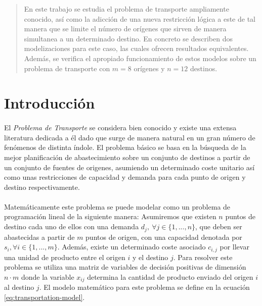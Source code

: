 \documentclass[a4paper, spanish]{article}
\begin{document}
  \maketitle

  \begin{abstract}
    \noindent En este trabajo se estudia el problema de transporte ampliamente conocido, así como la adicción de una nueva restricción lógica a este de tal manera que se limite el número de orígenes que sirven de manera simultanea a un determinado destino. En concreto se describen dos modelizaciones para este caso, las cuales ofrecen resultados equivalentes. Además, se verifica el apropiado funcionamiento de estos modelos sobre un problema de transporte con $m = 8$ orígenes y $n = 12$ destinos.
  \end{abstract}


  \section{Introducción}
  \label{sec:introduction}

    \paragraph{}
    El \emph{Problema de Transporte} se considera bien conocido y existe una extensa literatura dedicada a él dado que surge de manera natural en un gran número de fenómenos de distinta índole. El problema básico se basa en la búsqueda de la mejor planificación de abastecimiento sobre un conjunto de destinos a partir de un conjunto de fuentes de origenes, asumiendo un determinado coste unitario así como unas restricciones de capacidad y demanda para cada punto de origen y destino respectivamente.

    \paragraph{}
    Matemáticamente este problema se puede modelar como un problema de programación lineal de la siguiente manera: Asumiremos que existen $n$ puntos de destino cada uno de ellos con una demanda $d_j, \ \forall j \in \{1,...,n\}$, que deben ser abastecidas a partir de $m$ puntos de origen, con una capacidad denotada por $s_{i}, \forall i \in \{1, ..., m\}$. Además, existe un determinado coste asociado $c_{i, j}$ por llevar una unidad de producto entre el origen $i$ y el destino $j$. Para resolver este problema se utiliza una matriz de variables de decisión positivas de dimensión $n \cdot m$ donde la variable $x_{ij}$ determina la cantidad de producto enviado del origen $i$ al destino $j$. El modelo matemático para este problema se define en la ecuación \eqref{eq:transportation-model}.
\end{document}
